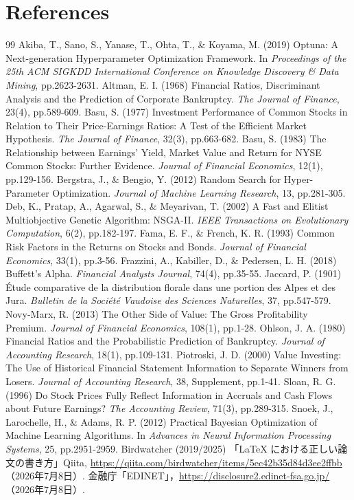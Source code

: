 \documentclass[a4paper,10pt]{article}
\newcommand{\1}{\mathbf{1}}
\begin{document}
\section{References}
\begin{thebibliography}{99}
 Akiba, T., Sano, S., Yanase, T., Ohta, T., \& Koyama, M. (2019) Optuna: A Next-generation Hyperparameter Optimization Framework. In \textit{Proceedings of the 25th ACM SIGKDD International Conference on Knowledge Discovery \& Data Mining}, pp.2623-2631.
 Altman, E. I. (1968) Financial Ratios, Discriminant Analysis and the Prediction of Corporate Bankruptcy. \textit{The Journal of Finance}, 23(4), pp.589-609.
 Basu, S. (1977) Investment Performance of Common Stocks in Relation to Their Price-Earnings Ratios: A Test of the Efficient Market Hypothesis. \textit{The Journal of Finance}, 32(3), pp.663-682.
 Basu, S. (1983) The Relationship between Earnings' Yield, Market Value and Return for NYSE Common Stocks: Further Evidence. \textit{Journal of Financial Economics}, 12(1), pp.129-156.
 Bergstra, J., \& Bengio, Y. (2012) Random Search for Hyper-Parameter Optimization. \textit{Journal of Machine Learning Research}, 13, pp.281-305.
 Deb, K., Pratap, A., Agarwal, S., \& Meyarivan, T. (2002) A Fast and Elitist Multiobjective Genetic Algorithm: NSGA-II. \textit{IEEE Transactions on Evolutionary Computation}, 6(2), pp.182-197.
 Fama, E. F., \& French, K. R. (1993) Common Risk Factors in the Returns on Stocks and Bonds. \textit{Journal of Financial Economics}, 33(1), pp.3-56.
 Frazzini, A., Kabiller, D., \& Pedersen, L. H. (2018) Buffett's Alpha. \textit{Financial Analysts Journal}, 74(4), pp.35-55.
 Jaccard, P. (1901) Étude comparative de la distribution florale dans une portion des Alpes et des Jura. \textit{Bulletin de la Société Vaudoise des Sciences Naturelles}, 37, pp.547-579.
 Novy-Marx, R. (2013) The Other Side of Value: The Gross Profitability Premium. \textit{Journal of Financial Economics}, 108(1), pp.1-28.
 Ohlson, J. A. (1980) Financial Ratios and the Probabilistic Prediction of Bankruptcy. \textit{Journal of Accounting Research}, 18(1), pp.109-131.
 Piotroski, J. D. (2000) Value Investing: The Use of Historical Financial Statement Information to Separate Winners from Losers. \textit{Journal of Accounting Research}, 38, Supplement, pp.1-41.
 Sloan, R. G. (1996) Do Stock Prices Fully Reflect Information in Accruals and Cash Flows about Future Earnings? \textit{The Accounting Review}, 71(3), pp.289-315.
 Snoek, J., Larochelle, H., \& Adams, R. P. (2012) Practical Bayesian Optimization of Machine Learning Algorithms. In \textit{Advances in Neural Information Processing Systems}, 25, pp.2951-2959.
 Birdwatcher (2019/2025) 「LaTeX における正しい論文の書き方」Qiita, \url{https://qiita.com/birdwatcher/items/5ec42b35d84d3ee2ffbb}（2026年7月8日）.
 金融庁「EDINET」，\url{https://disclosure2.edinet-fsa.go.jp/}（2026年7月8日）.
\end{thebibliography}
\end{document}
